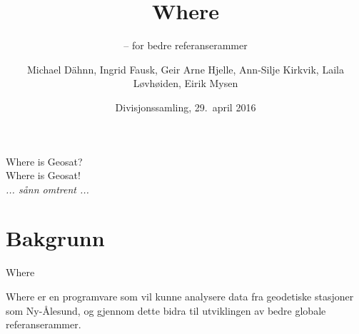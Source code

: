 \documentclass[12pt,table,t]{beamer}
\title{Where}
\subtitle{-- for bedre referanserammer}
\author{Michael Dähnn, Ingrid Fausk, Geir Arne Hjelle, Ann-Silje
  Kirkvik, Laila Løvhøiden, Eirik Mysen}
\date{Divisjonssamling, 29.\ april 2016}
\begin{document}
\frame[plain]{\titlepage}

\begin{frame}{}  %
  \begin{center}
    \vfill {\Huge Where is Geosat?} \\
    \pause
    \vfill {\Huge Where is Geosat!} \\
    \pause
    \hfil \emph{... sånn omtrent ...}
    \vfill
  \end{center}
\end{frame}


\part{Bakgrunn}

\begin{frame}{Where}

  Where er en programvare som vil kunne analysere data fra geodetiske stasjoner som Ny-Ålesund, og gjennom dette
  bidra til utviklingen av bedre globale referanserammer.
  \pause


\end{frame}
\end{document}
